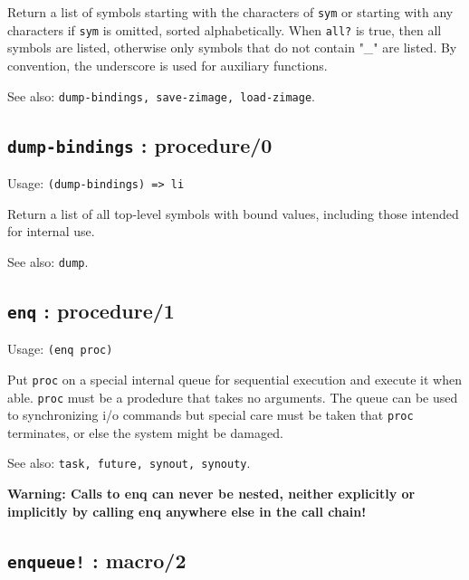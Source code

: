 \documentclass[
]{article}
\newcommand{\passthrough}[1]{#1}
\begin{document}
Return a list of symbols starting with the characters of
\passthrough{\lstinline!sym!} or starting with any characters if
\passthrough{\lstinline!sym!} is omitted, sorted alphabetically. When
\passthrough{\lstinline!all?!} is true, then all symbols are listed,
otherwise only symbols that do not contain "\_" are listed. By
convention, the underscore is used for auxiliary functions.

See also:
\passthrough{\lstinline!dump-bindings, save-zimage, load-zimage!}.

\hypertarget{dump-bindings-procedure0-1}{%
\subsection{\texorpdfstring{\texttt{dump-bindings} :
procedure/0}{dump-bindings : procedure/0}}\label{dump-bindings-procedure0-1}}

Usage: \passthrough{\lstinline!(dump-bindings) => li!}

Return a list of all top-level symbols with bound values, including
those intended for internal use.

See also: \passthrough{\lstinline!dump!}.

\hypertarget{enq-procedure1-1}{%
\subsection{\texorpdfstring{\texttt{enq} :
procedure/1}{enq : procedure/1}}\label{enq-procedure1-1}}

Usage: \passthrough{\lstinline!(enq proc)!}

Put \passthrough{\lstinline!proc!} on a special internal queue for
sequential execution and execute it when able.
\passthrough{\lstinline!proc!} must be a prodedure that takes no
arguments. The queue can be used to synchronizing i/o commands but
special care must be taken that \passthrough{\lstinline!proc!}
terminates, or else the system might be damaged.

See also: \passthrough{\lstinline!task, future, synout, synouty!}.

\textbf{Warning: Calls to enq can never be nested, neither explicitly or
implicitly by calling enq anywhere else in the call chain!}

\hypertarget{enqueue-macro2-1}{%
\subsection{\texorpdfstring{\texttt{enqueue!} :
macro/2}{enqueue! : macro/2}}\label{enqueue-macro2-1}}
\end{document}
